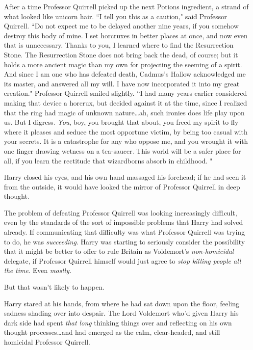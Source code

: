 After a time Professor Quirrell picked up the next Potions ingredient, a strand of what looked like unicorn hair. ``I tell you this as a caution," said Professor Quirrell. ``Do not expect me to be delayed another nine years, if you somehow destroy this body of mine. I set horcruxes in better places at once, and now even that is unnecessary. Thanks to you, I learned where to find the Resurrection Stone. The Resurrection Stone does not bring back the dead, of course; but it holds a more ancient magic than my own for projecting the seeming of a spirit. And since I am one who has defeated death, Cadmus's Hallow acknowledged me its master, and answered all my will. I have now incorporated it into my great creation." Professor Quirrell smiled slightly. ``I had many years earlier considered making that device a horcrux, but decided against it at the time, since I realized that the ring had magic of unknown nature…ah, such ironies does life play upon us. But I digress. \emph{You}, boy, you brought that about, you freed my spirit to fly where it pleases and seduce the most opportune victim, by being too casual with your secrets. It is a catastrophe for any who oppose me, and you wrought it with one finger drawing wetness on a tea-saucer. This world will be a safer place for all, if you learn the rectitude that wizardborns absorb in childhood. "

Harry closed his eyes, and his own hand massaged his forehead; if he had seen it from the outside, it would have looked the mirror of Professor Quirrell in deep thought.

The problem of defeating Professor Quirrell was looking increasingly difficult, even by the standards of the sort of impossible problems that Harry had solved already. If communicating that difficulty was what Professor Quirrell was trying to do, he was \emph{succeeding}. Harry was starting to seriously consider the possibility that it might be better to offer to rule Britain as Voldemort's \emph{non-homicidal} delegate, if Professor Quirrell himself would just agree to \emph{stop killing people all the time}. Even \emph{mostly}.

But that wasn't likely to happen.

Harry stared at his hands, from where he had sat down upon the floor, feeling sadness shading over into despair. The Lord Voldemort who'd given Harry his dark side had spent \emph{that long} thinking things over and reflecting on his own thought processes…and had emerged as the calm, clear-headed, and still homicidal Professor Quirrell.

